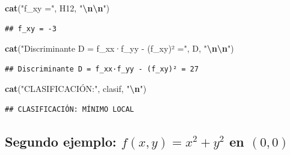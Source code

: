 \documentclass[
]{book}
\newenvironment{Shaded}{\begin{snugshade}}{\end{snugshade}}
\newcommand{\FunctionTok}[1]{\textcolor[rgb]{0.13,0.29,0.53}{\textbf{#1}}}
\newcommand{\NormalTok}[1]{#1}
\newcommand{\SpecialCharTok}[1]{\textcolor[rgb]{0.81,0.36,0.00}{\textbf{#1}}}
\newcommand{\StringTok}[1]{\textcolor[rgb]{0.31,0.60,0.02}{#1}}
\begin{document}
\begin{Shaded}
\begin{Highlighting}[]
\FunctionTok{cat}\NormalTok{(}\StringTok{"f\_xy ="}\NormalTok{, H12, }\StringTok{"}\SpecialCharTok{\textbackslash{}n\textbackslash{}n}\StringTok{"}\NormalTok{)}
\end{Highlighting}
\end{Shaded}

\begin{verbatim}
## f_xy = -3
\end{verbatim}

\begin{Shaded}
\begin{Highlighting}[]
\FunctionTok{cat}\NormalTok{(}\StringTok{"Discriminante D = f\_xx·f\_yy {-} (f\_xy)² ="}\NormalTok{, D, }\StringTok{"}\SpecialCharTok{\textbackslash{}n\textbackslash{}n}\StringTok{"}\NormalTok{)}
\end{Highlighting}
\end{Shaded}

\begin{verbatim}
## Discriminante D = f_xx·f_yy - (f_xy)² = 27
\end{verbatim}

\begin{Shaded}
\begin{Highlighting}[]
\FunctionTok{cat}\NormalTok{(}\StringTok{"CLASIFICACIÓN:"}\NormalTok{, clasif, }\StringTok{"}\SpecialCharTok{\textbackslash{}n}\StringTok{"}\NormalTok{)}
\end{Highlighting}
\end{Shaded}

\begin{verbatim}
## CLASIFICACIÓN: MÍNIMO LOCAL
\end{verbatim}

\subsection{\texorpdfstring{Segundo ejemplo: \(f(x, y) = x^2 + y^2\) en \((0, 0)\)}{Segundo ejemplo: f(x, y) = x\^{}2 + y\^{}2 en (0, 0)}}\label{segundo-ejemplo-fx-y-x2-y2-en-0-0}
\end{document}
